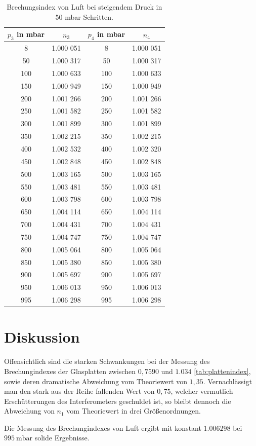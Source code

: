 \begin{table}[H]
    \center
    \caption{Brechungsindex von Luft bei steigendem Druck in 50 mbar Schritten.}
    \label{tab:druckdaten2}
    \begin{tabular}{c|c|c|c}
      $p_3$ in mbar&$n_3$ &$p_4$ in mbar &$n_4$\\
      \hline
      8  & 1.000 051& 8  & 1.000 051\\
      50 & 1.000 317& 50 & 1.000 317\\
      100& 1.000 633& 100& 1.000 633\\
      150& 1.000 949& 150& 1.000 949\\
      200& 1.001 266& 200& 1.001 266\\
      250& 1.001 582& 250& 1.001 582\\
      300& 1.001 899& 300& 1.001 899\\
      350& 1.002 215& 350& 1.002 215\\
      400& 1.002 532& 400& 1.002 320\\
      450& 1.002 848& 450& 1.002 848\\
      500& 1.003 165& 500& 1.003 165\\
      550& 1.003 481& 550& 1.003 481\\
      600& 1.003 798& 600& 1.003 798\\
      650& 1.004 114& 650& 1.004 114\\
      700& 1.004 431& 700& 1.004 431\\
      750& 1.004 747& 750& 1.004 747\\
      800& 1.005 064& 800& 1.005 064\\
      850& 1.005 380& 850& 1.005 380\\
      900& 1.005 697& 900& 1.005 697\\
      950& 1.006 013& 950& 1.006 013\\
      995& 1.006 298& 995& 1.006 298\\
    \end{tabular}
\end{table}

\section{Diskussion}
Offensichtlich sind die starken Schwankungen bei der Messung des Brechungindexes der Glasplatten zwischen $0,7590$ und $1.034$ \ref{tab:plattenindex}, sowie deren dramatische Abweichung vom Theoriewert von $1,35$. Vernachlässigt man den stark aus der Reihe fallenden Wert von $0,75$, welcher vermutlich Erschütterungen des Interferometers geschuldet ist, so bleibt dennoch die Abweichung von $n_1$ vom Theoriewert in drei Größenordnungen.

Die Messung des Brechungindexes von Luft ergibt mit konstant $1.006298$ bei $\SI{995}{\milli\bar}$ solide Ergebnisse.

\printbibliography
\nocite{*}

